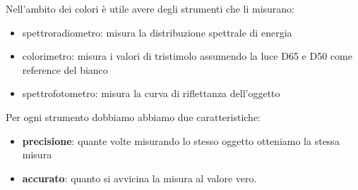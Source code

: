 Nell'ambito dei colori è utile avere degli strumenti che li misurano:
\begin{itemize}
    \item spettroradiometro: misura la distribuzione spettrale di energia
    \item colorimetro: misura i valori di tristimolo assumendo la luce D65 e D50
    come reference del bianco
    \item spettrofotometro: misura la curva di riflettanza dell'oggetto
\end{itemize}
Per ogni strumento dobbiamo abbiamo due caratteristiche:
\begin{itemize}
    \item \textbf{precisione}: quante volte misurando lo stesso oggetto otteniamo 
    la stessa misura
    \item \textbf{accurato}: quanto si avvicina la misura al valore vero. 
\end{itemize}

